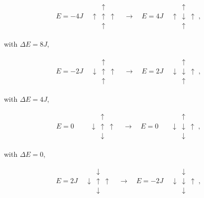 \documentclass[reprint,english,notitlepage]{revtex4-1}  %
\begin{document}
\begin{align*}
E = -4J \quad \begin{array}{ccc}
& \uparrow & \\
\uparrow & \uparrow & \uparrow \\
& \uparrow &
\end{array} \quad \to \quad E = 4J \quad \begin{array}{ccc}
& \uparrow & \\
\uparrow & \downarrow & \uparrow \\
& \uparrow &
\end{array} \, ,
\end{align*}

with $\Delta E = 8J$, 

\begin{align*}
E = -2J \quad \begin{array}{ccc}
& \uparrow & \\
\downarrow & \uparrow & \uparrow \\
& \uparrow &
\end{array} \quad \to \quad E = 2J \quad \begin{array}{ccc}
& \uparrow & \\
\downarrow & \downarrow & \uparrow \\
& \uparrow &
\end{array} \, ,
\end{align*}

with $\Delta E = 4J$,

\begin{align*}
E = 0 \quad \, \quad \begin{array}{ccc}
& \uparrow & \\
\downarrow & \uparrow & \uparrow \\
& \downarrow &
\end{array} \quad \to \quad E = 0 \,\,\,\, \quad \begin{array}{ccc}
& \uparrow & \\
\downarrow & \downarrow & \uparrow \\
& \downarrow &
\end{array} \, ,
\end{align*}

with $\Delta E = 0$, 

\begin{align*}
E = 2J \quad \begin{array}{ccc}
& \downarrow & \\
\downarrow & \uparrow & \uparrow \\
& \downarrow &
\end{array} \quad \to \quad E = -2J \quad \begin{array}{ccc}
& \downarrow & \\
\downarrow & \downarrow & \uparrow \\
& \downarrow &
\end{array} \, ,
\end{align*}
\end{document}

